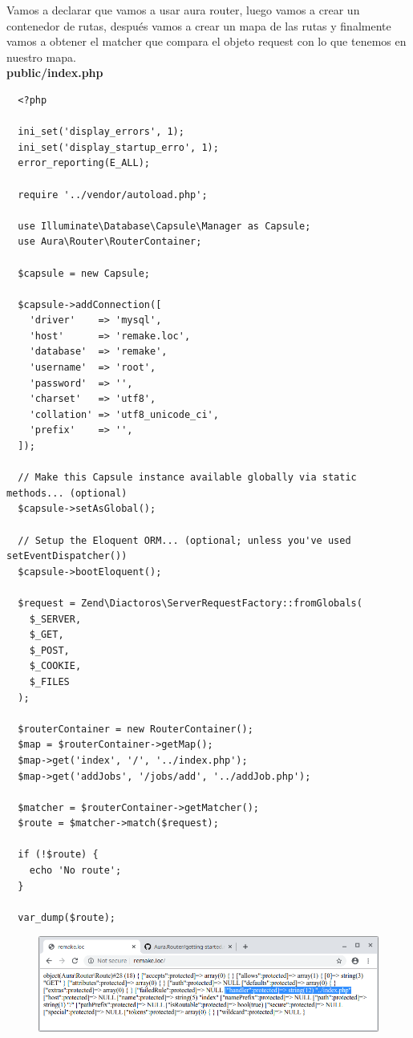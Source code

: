 \documentclass{article}
\begin{document}
Vamos a declarar que vamos a usar aura router, luego vamos a crear un
contenedor de rutas, después vamos a crear un mapa de las rutas y finalmente
vamos a obtener el matcher que compara el objeto request con lo que tenemos en
nuestro mapa.\\

\textbf{public/index.php}
\begin{verbatim}
  <?php

  ini_set('display_errors', 1);
  ini_set('display_startup_erro', 1);
  error_reporting(E_ALL);

  require '../vendor/autoload.php';

  use Illuminate\Database\Capsule\Manager as Capsule;
  use Aura\Router\RouterContainer;

  $capsule = new Capsule;

  $capsule->addConnection([
    'driver'    => 'mysql',
    'host'      => 'remake.loc',
    'database'  => 'remake',
    'username'  => 'root',
    'password'  => '',
    'charset'   => 'utf8',
    'collation' => 'utf8_unicode_ci',
    'prefix'    => '',
  ]);

  // Make this Capsule instance available globally via static methods... (optional)
  $capsule->setAsGlobal();

  // Setup the Eloquent ORM... (optional; unless you've used setEventDispatcher())
  $capsule->bootEloquent();

  $request = Zend\Diactoros\ServerRequestFactory::fromGlobals(
    $_SERVER,
    $_GET,
    $_POST,
    $_COOKIE,
    $_FILES
  );

  $routerContainer = new RouterContainer();
  $map = $routerContainer->getMap();
  $map->get('index', '/', '../index.php');
  $map->get('addJobs', '/jobs/add', '../addJob.php');

  $matcher = $routerContainer->getMatcher();
  $route = $matcher->match($request);

  if (!$route) {
    echo 'No route';
  }

  var_dump($route);
\end{verbatim}

\begin{figure}[h!]
  \centering
  \includegraphics[scale=0.5]{./Pictures/120_object_handler.png}
\end{figure}
\end{document}
